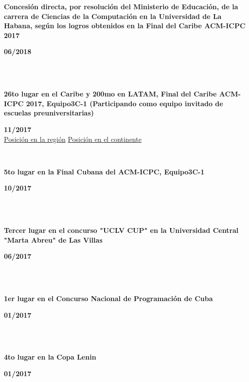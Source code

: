 \documentclass{article}
\begin{document}
\begin{minipage}{0.8\textwidth}
\parbox{0.8\linewidth}{\textbf{Concesión directa, por resolución del Ministerio de Educación, de la carrera de Ciencias de la Computación en la Universidad de La Habana, según los logros obtenidos en la Final del Caribe ACM-ICPC 2017}} \hfill \textbf{06/2018}\\
\\
\end{minipage} \\
\begin{minipage}{0.8\textwidth}
\parbox{0.8\linewidth}{\textbf{26to lugar en el Caribe y 200mo en LATAM, Final del Caribe ACM-ICPC 2017, Equipo3C-1 (Participando como equipo invitado de escuelas preuniversitarias)}} \hfill \textbf{11/2017}\\
\href{https://matcomgrader.com/media/posts/5167/ranking/caribbean.png}{Posición en la región}
\href{https://matcomgrader.com/media/posts/5167/ranking/general.png}{Posición en el continente}
\\
\end{minipage} \hfill {}\\
\begin{minipage}{0.8\textwidth}
\parbox{0.8\linewidth}{\textbf{5to lugar en la Final Cubana del ACM-ICPC, Equipo3C-1}} \hfill \textbf{10/2017}\\
\\
\end{minipage}\\
\begin{minipage}{0.8\textwidth}
\parbox{0.8\linewidth}{\textbf{Tercer lugar en el concurso "UCLV CUP" en la Universidad Central "Marta Abreu" de Las Villas}} \hfill \textbf{06/2017}\\
\\
\end{minipage}\\
\begin{minipage}{0.8\textwidth}
\parbox{0.8\linewidth}{\textbf{1er lugar en el Concurso Nacional de Programación de Cuba}} \hfill \textbf{01/2017}\\
\\
\end{minipage}\\
\begin{minipage}{0.8\textwidth}
\parbox{0.8\linewidth}{\textbf{4to lugar en la Copa Lenin}} \hfill \textbf{01/2017}\\
\\
\end{minipage}\\
\end{document}
